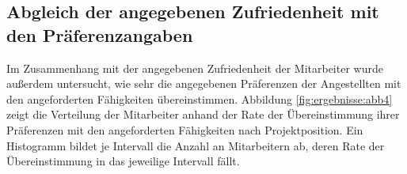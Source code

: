 \subsection{Abgleich der angegebenen Zufriedenheit mit den Präferenzangaben}
Im Zusammenhang mit der angegebenen Zufriedenheit der Mitarbeiter wurde außerdem untersucht, wie sehr die angegebenen Präferenzen der Angestellten mit den angeforderten Fähigkeiten übereinstimmen.
Abbildung \ref{fig:ergebnisse:abb4} zeigt die Verteilung der Mitarbeiter anhand der Rate der Übereinstimmung ihrer Präferenzen mit den angeforderten Fähigkeiten nach Projektposition.
Ein Histogramm bildet je Intervall die Anzahl an Mitarbeitern ab, deren Rate der Übereinstimmung in das jeweilige Intervall fällt.

\begin{figure}
    \centering
    \\

\end{figure}
